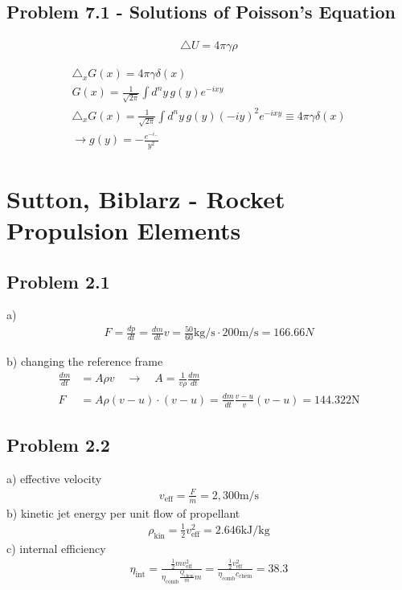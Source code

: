 \documentclass[../main.tex]{subfiles}
\begin{document}
\subsection{Problem 7.1 - Solutions of Poisson's Equation}
\begin{align}
    \triangle U=4\pi \gamma\rho
\end{align}

\begin{align}
    \triangle_x G(x)=4\pi \gamma\delta(x)\\
    G(x)=\frac{1}{\sqrt{2\pi}}\int d^ny\,g(y)e^{-ixy}\\
    \triangle_x G(x)=\frac{1}{\sqrt{2\pi}}\int d^ny\,g(y)(-iy)^2e^{-ixy}\equiv4\pi\gamma\delta(x)\\
    \rightarrow g(y)=-\frac{e^{-i..}}{y^2}
\end{align}

\section{{\sc Sutton, Biblarz} - Rocket Propulsion Elements}
\subsection{Problem 2.1}
a)
\begin{align}
F=\frac{dp}{dt}=\frac{dm}{dt}v=\frac{50}{60}\text{kg/s}\cdot200\text{m/s}=166.66N
\end{align}

b) changing the reference frame
\begin{align}
\frac{dm}{dt}&=A\rho v\quad\rightarrow\quad A=\frac{1}{v\rho}\frac{dm}{dt}\\
F&=A\rho(v-u)\cdot(v-u)=\frac{dm}{dt}\frac{v-u}{v}(v-u)=144.322\text{N}
\end{align}

\subsection{Problem 2.2}
a) effective velocity
\begin{align}
v_\text{eff}=\frac{F}{\dot{m}}=2,300\text{m/s}
\end{align}
b) kinetic jet energy per unit flow of propellant
\begin{align}
\rho_\text{kin}=\frac{1}{2}v_\text{eff}^2=2.646\text{kJ/kg}
\end{align}
c) internal efficiency
\begin{align}
\eta_\text{int}=\frac{\frac{1}{2}mv_\text{eff}^2}{\eta_\text{comb}\frac{Q_\text{chem}}{m}m}=\frac{\frac{1}{2}v_\text{eff}^2}{\eta_\text{comb}c_\text{chem}}=38.3%
\end{align}
\end{document}
